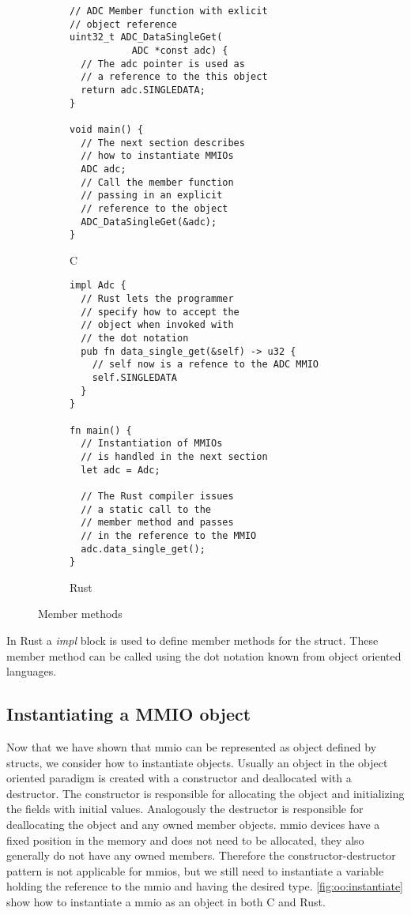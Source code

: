 \begin{figure}[H]
  \centering

  \begin{subfigure}{0.47\textwidth}
      \begin{verbatim}
// ADC Member function with exlicit
// object reference
uint32_t ADC_DataSingleGet(
           ADC *const adc) {
  // The adc pointer is used as
  // a reference to the this object
  return adc.SINGLEDATA;
}

void main() {
  // The next section describes
  // how to instantiate MMIOs
  ADC adc;
  // Call the member function
  // passing in an explicit
  // reference to the object
  ADC_DataSingleGet(&adc);
}
      \end{verbatim}
      \caption{C}
      \label{lst:back:adc:get:c}
  \end{subfigure}
  \hfill
  \begin{subfigure}{0.47\textwidth}
      \begin{verbatim}
impl Adc {
  // Rust lets the programmer
  // specify how to accept the
  // object when invoked with
  // the dot notation
  pub fn data_single_get(&self) -> u32 {
    // self now is a refence to the ADC MMIO
    self.SINGLEDATA
  }
}

fn main() {
  // Instantiation of MMIOs
  // is handled in the next section
  let adc = Adc;

  // The Rust compiler issues
  // a static call to the
  // member method and passes
  // in the reference to the MMIO
  adc.data_single_get();
}
      \end{verbatim}
      \caption{Rust}
      \label{lst:back:adc:get:rust}
  \end{subfigure}
  \caption{Member methods}
  \label{lst:back:adc:get}

\end{figure}
In Rust a \emph{impl} block is used to define member methods for the struct.
These member method can be called using the dot notation known from object oriented languages.

\subsection{Instantiating a MMIO object}

Now that we have shown that \gls{mmio} can be represented as object defined by structs, we consider how to instantiate objects.
Usually an object in the object oriented paradigm is created with a constructor and deallocated with a destructor.
The constructor is responsible for allocating the object and initializing the fields with initial values.
Analogously the destructor is responsible for deallocating the object and any owned member objects.
\gls{mmio} devices have a fixed position in the memory and does not need to be allocated, they also generally do not have any owned members.
Therefore the constructor-destructor pattern is not applicable for \gls{mmio}s, but we still need to instantiate a variable holding the reference to the \gls{mmio} and having the desired type.
\autoref{fig:oo:instantiate} show how to instantiate a \gls{mmio} as an object in both C and Rust.

